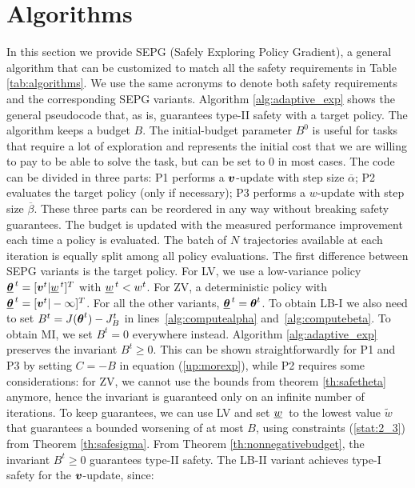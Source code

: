 \section{Algorithms}\label{sec:algos}

In this section we provide SEPG (Safely Exploring Policy Gradient), a general algorithm that can be customized to match all the safety requirements in Table \ref{tab:algorithms}. We use the same acronyms to denote both safety requirements and the corresponding SEPG variants. Algorithm \ref{alg:adaptive_exp} shows the general pseudocode that, as is, guarantees type-II safety with a target policy. The algorithm keeps a budget $B$. The initial-budget parameter $B^0$ is useful for tasks that require a lot of exploration and represents the initial cost that we are willing to pay to be able to solve the task, but can be set to $0$ in most cases. The code can be divided in three parts: P1 performs a $\vv$-update with step size $\overline{\alpha}$; P2 evaluates the target policy (only if necessary); P3 performs a $w$-update with step size $\overline{\beta}$. These three parts can be reordered in any way without breaking safety guarantees.
%
%
The budget is updated with the measured performance improvement each time a policy is evaluated. The batch of $N$ trajectories available at each iteration is equally split among all policy evaluations.
The first difference between SEPG variants is the target policy.
For LV, we use a low-variance policy $\vtarget = [\vv^t \vert\wtarget]^T$ with $\wtarget<w^t$. For ZV, a deterministic policy with $\vtarget=[\vv^t\vert-\infty]^T$. For all the other variants, $\vtarget=\vtheta^t$. To obtain LB-I we also need to set $B^t = J(\vtheta^t) - \jbase$ in lines~\ref{alg:computealpha} and~\ref{alg:computebeta}. To obtain MI, we set $B^t = 0$ everywhere instead.
Algorithm \ref{alg:adaptive_exp} preserves the invariant $B^t\geq 0$. This can be shown straightforwardly for P1 and P3 by setting $C=-B$ in equation (\ref{up:morexp}), while P2 requires some considerations: for ZV, we cannot use the bounds from theorem \ref{th:safetheta} anymore, hence the invariant is guaranteed only on an infinite number of iterations. To keep guarantees, we can use LV and set $\wtarget[]$ to the lowest value $\tilde{w}$ that guarantees a bounded worsening of at most $B$, using constraints (\ref{stat:2_3}) from Theorem \ref{th:safesigma}. 
From Theorem \ref{th:nonnegativebudget}, the invariant $B^t \geq 0$ guarantees type-II safety. The LB-II variant achieves type-I safety for the $\vv$-update, since:
